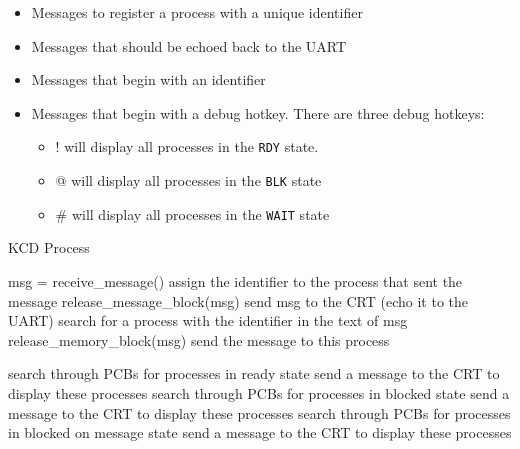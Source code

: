 \documentclass[12pt]{report}
\begin{document}
\begin{itemize}
	\item Messages to register a process with a unique identifier
    \item Messages that should be echoed back to the UART
    \item Messages that begin with an identifier
    \item Messages that begin with a debug hotkey.  There are three debug hotkeys:
    \begin{itemize}
		\item ! will display all processes in the \texttt{RDY} state.
        \item @ will display all processes in the \texttt{BLK} state 
        \item \# will display all processes in the \texttt{WAIT} state 
	\end{itemize}
    
\end{itemize}

\begin{algorithm}[H]
	\caption{KCD Process}
	\begin{algorithmic}[1]
	      \State msg = receive\_message()
	        \State assign the identifier to the process that sent the message
	        \State release\_message\_block(msg)
	        \State send msg to the CRT (echo it to the UART)
	      \Else
	          \State search for a process with the identifier in the text of msg
	        \EndIf
	          \State release\_memory\_block(msg)
	        \Else
	          \State send the message to this process
	        \EndIf

	          \State search through PCBs for processes in ready state
	          \State send a message to the CRT to display these processes
	          \State search through PCBs for processes in blocked state
	          \State send a message to the CRT to display these processes
	          \State search through PCBs for processes in blocked on message state
	          \State send a message to the CRT to display these processes
	        \EndIf
	      \EndIf
	    \EndWhile
	  \EndFunction
	\end{algorithmic}
\end{algorithm}
\end{document}
